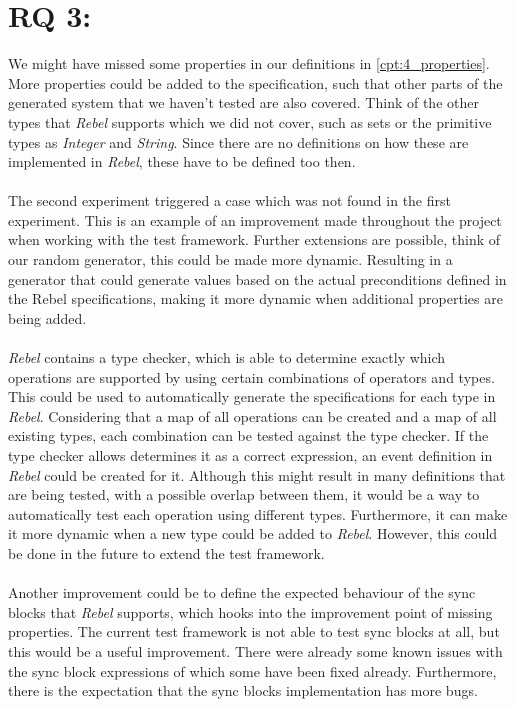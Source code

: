 \section{RQ 3: \rqThree}
We might have missed some properties in our definitions in \autoref{cpt:4_properties}. More properties could be added to the specification, such that other parts of the generated system that we haven't tested are also covered. Think of the other types that \textit{Rebel} supports which we did not cover, such as sets or the primitive types as \textit{Integer} and \textit{String}. Since there are no definitions on how these are implemented in \textit{Rebel}, these have to be defined too then.\\
\\
The second experiment triggered a case which was not found in the first experiment. This is an example of an improvement made throughout the project when working with the test framework. Further extensions are possible, think of our random generator, this could be made more dynamic. Resulting in a generator that could generate values based on the actual preconditions defined in the Rebel specifications, making it more dynamic when additional properties are being added.\\
\\
\textit{Rebel} contains a type checker, which is able to determine exactly which operations are supported by using certain combinations of operators and types. This could be used to automatically generate the specifications for each type in \textit{Rebel}. Considering that a map of all operations can be created and a map of all existing types, each combination can be tested against the type checker. If the type checker allows determines it as a correct expression, an event definition in \textit{Rebel} could be created for it. Although this might result in many definitions that are being tested, with a possible overlap between them, it would be a way to automatically test each operation using different types. Furthermore, it can make it more dynamic when a new type could be added to \textit{Rebel}. However, this could be done in the future to extend the test framework.\\
\\
Another improvement could be to define the expected behaviour of the sync blocks that \textit{Rebel} supports, which hooks into the improvement point of missing properties. The current test framework is not able to test sync blocks at all, but this would be a useful improvement. There were already some known issues with the sync block expressions of which some have been fixed already. Furthermore, there is the expectation that the sync blocks implementation has more bugs.\\
